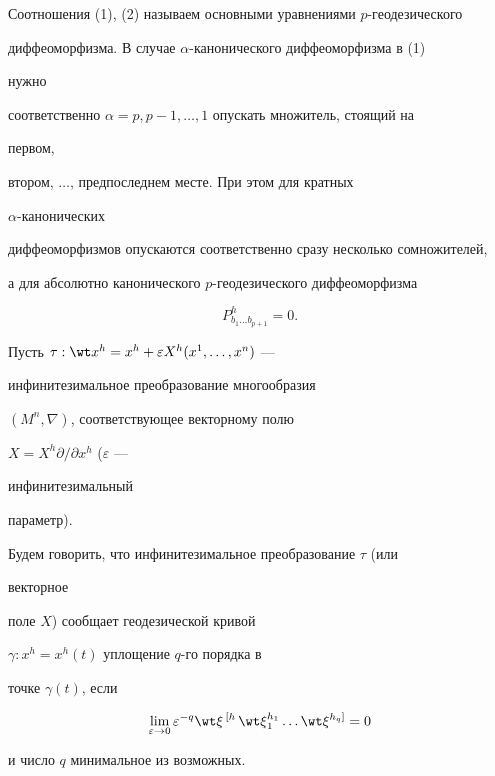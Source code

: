 Соотношения (1), (2) называем основными уравнениями $p$-геодезического


диффеоморфизма. В случае $\alpha$-канонического диффеоморфизма в (1)


нужно


соответственно $\alpha=p,p-1,\dotsc,1$ опускать множитель, стоящий на


первом,


втором, $\dotsc$, предпоследнем месте. При этом для кратных


$\alpha$-канонических


диффеоморфизмов опускаются соответственно сразу несколько сомножителей,


а для абсолютно канонического $p$-геодезического диффеоморфизма


\begin{equation}


P^h_{b_1\dots b_{p+1}}=0.


\end{equation}





Пусть $\tau:\wt x^h=x^h+\varepsilon X^h(x^1,\dotsc,x^n)$ ---


инфинитезимальное преобразование многообразия


$(M^n,\nabla)$, соответствующее векторному полю


$X=X^h\partial/\partial x^h$ ($\varepsilon$ ---


инфинитезимальный


параметр).





\begin{defn}


Будем говорить, что инфинитезимальное преобразование $\tau$ (или


векторное


поле $X$) сообщает геодезической кривой


$\gamma:x^h=x^h(t)$ уплощение $q$-го порядка в


точке $\gamma(t)$, если


$$


\lim_{\varepsilon\to 0}\varepsilon^{-q}


\wt\xi\,{}^{[h}\,\wt\xi{}^{h_1}_1\dots\wt\xi{}^{h_q]}=0


$$


и число $q$ минимальное из возможных.


\end{defn}





